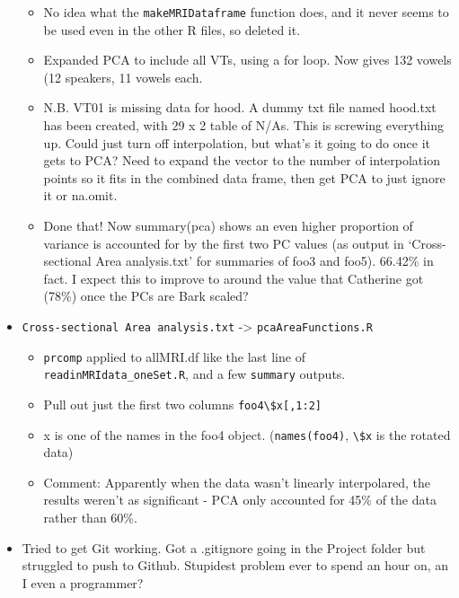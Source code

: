 \documentclass{article}
\begin{document}
\begin{itemize}
\begin{itemize}
        \item No idea what the \verb|makeMRIDataframe| function does, and it never seems to be used even in the other R files, so deleted it.
        \item Expanded PCA to include all VTs, using a for loop. Now gives 132 vowels (12 speakers, 11 vowels each.
        \item N.B. VT01 is missing data for hood. A dummy txt file named hood.txt has been created, with 29 x 2 table of N/As. This is screwing everything up. Could just turn off interpolation, but what's it going to do once it gets to PCA? Need to expand the vector to the number of interpolation points so it fits in the combined data frame, then get PCA to just ignore it or na.omit.
        \item Done that! Now summary(pca) shows an even higher proportion of variance is accounted for by the first two PC values (as output in `Cross-sectional Area analysis.txt' for summaries of foo3 and foo5). 66.42\% in fact. I expect this to improve to around the value that Catherine got (78\%) once the PCs are Bark scaled?
    \end{itemize}
    \item \verb|Cross-sectional Area analysis.txt| -> \verb|pcaAreaFunctions.R|
    \begin{itemize}
        \item \verb|prcomp| applied to allMRI.df like the last line of \verb|readinMRIdata_oneSet.R|, and a few \verb|summary| outputs.
        \item Pull out just the first two columns \verb|foo4\$x[,1:2]|
        \item x is one of the names in the foo4 object. (\verb|names(foo4)|, \verb|\$x| is the rotated data)
        \item Comment: Apparently when the data wasn't linearly interpolared, the results weren't as significant - PCA only accounted for 45\% of the data rather than 60\%.
    \end{itemize}
    \item Tried to get Git working. Got a .gitignore going in the Project folder but struggled to push to Github. Stupidest problem ever to spend an hour on, an I even a programmer?
\end{itemize}
\end{document}
